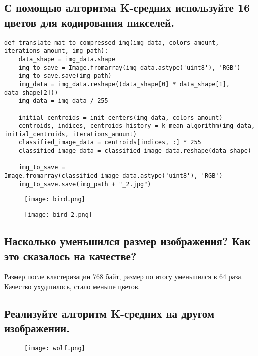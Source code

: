 \subsection{С помощью алгоритма K-средних используйте 16 цветов для кодирования пикселей.}

\begin{lstlisting}
def translate_mat_to_compressed_img(img_data, colors_amount, iterations_amount, img_path):
    data_shape = img_data.shape
    img_to_save = Image.fromarray(img_data.astype('uint8'), 'RGB')
    img_to_save.save(img_path)
    img_data = img_data.reshape((data_shape[0] * data_shape[1], data_shape[2]))
    img_data = img_data / 255

    initial_centroids = init_centers(img_data, colors_amount)
    centroids, indices, centroids_history = k_mean_algorithm(img_data, initial_centroids, iterations_amount)
    classified_image_data = centroids[indices, :] * 255
    classified_image_data = classified_image_data.reshape(data_shape)

    img_to_save = Image.fromarray(classified_image_data.astype('uint8'), 'RGB')
    img_to_save.save(img_path + "_2.jpg")
\end{lstlisting}

\begin{figure}[h]
\centering
    \texttt{[image: bird.png]}
  \label{sec:purpose:payings}
\end{figure}

\begin{figure}[h]
\centering
    \texttt{[image: bird\_2.png]}
  \label{sec:purpose:payings}
\end{figure}

\subsection{Насколько уменьшился размер изображения? Как это сказалось на качестве?}

Размер после кластеризации 768 байт, размер по итогу уменьшился в 64 раза. Качество ухудшилось, стало меньше цветов.

\subsection{Реализуйте алгоритм K-средних на другом изображении.}

\begin{figure}[h]
\centering
    \texttt{[image: wolf.png]}
  \label{sec:purpose:payings}
\end{figure}

